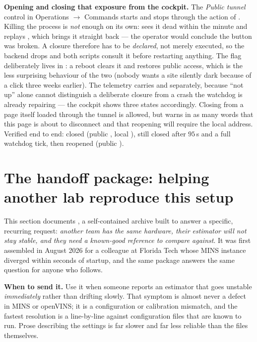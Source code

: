 \noindent \textbf{Opening and closing that exposure from the cockpit.} The
\emph{Public tunnel} control in Operations $\rightarrow$ Commands starts and
stops  through the  action of
. Killing the process is \emph{not} enough on its own:
 sees it dead within the minute and replays
, which brings it straight back --- the operator would
conclude the button was broken. A closure therefore has to be \emph{declared},
not merely executed, so the backend drops  and both
scripts consult it before restarting anything. The flag deliberately lives in
: a reboot clears it and restores public access, which is the less
surprising behaviour of the two (nobody wants a site silently dark because of
a click three weeks earlier). The telemetry carries  and
 separately, because ``not up'' alone cannot distinguish a
deliberate closure from a crash the watchdog is already repairing --- the
cockpit shows three states accordingly. Closing from a page itself loaded
through the tunnel is allowed, but warns in as many words that this page is
about to disconnect and that reopening will require the local address.
Verified end to end: closed (public , local ), still closed
after $95$\,s and a full watchdog tick, then reopened (public ).

\section{The handoff package: helping another lab reproduce this setup}
\label{ap:handoff-package}

This section documents , a self-contained
archive built to answer a specific, recurring request: \emph{another team has
the same hardware, their estimator will not stay stable, and they need a
known-good reference to compare against}. It was first assembled in August 2026
for a colleague at Florida Tech whose MINS instance diverged within seconds of
startup, and the same package answers the same question for anyone who follows.

\noindent \textbf{When to send it.} Use it when someone reports an estimator
that goes unstable \emph{immediately} rather than drifting slowly. That symptom
is almost never a defect in MINS or openVINS; it is a configuration or
calibration mismatch, and the fastest resolution is a line-by-line
 against configuration files that are known to run. Prose describing
the settings is far slower and far less reliable than the files themselves.

